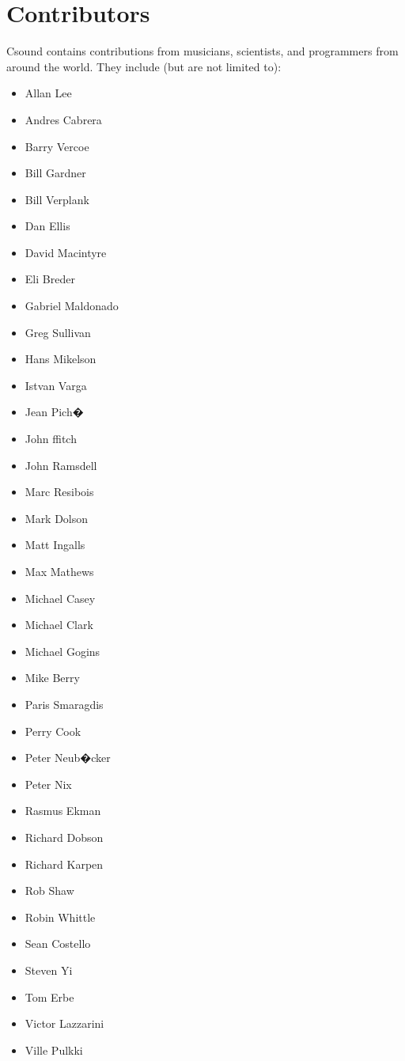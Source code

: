 \documentclass[10pt,letterpaper,onecolumn]{ltxguide}
\begin{document}
\section{Contributors}
Csound contains contributions from musicians, scientists, and programmers from around the world. They include (but are not limited to): 
\begin{itemize}
\item Allan Lee 
\item Andres Cabrera
\item Barry Vercoe
\item Bill Gardner 
\item Bill Verplank 
\item Dan Ellis 
\item David Macintyre 
\item Eli Breder 
\item Gabriel Maldonado  
\item Greg Sullivan 
\item Hans Mikelson 
\item Istvan Varga 
\item Jean Pich� 
\item John ffitch 
\item John Ramsdell 
\item Marc Resibois 
\item Mark Dolson 
\item Matt Ingalls 
\item Max Mathews 
\item Michael Casey 
\item Michael Clark 
\item Michael Gogins 
\item Mike Berry 
\item Paris Smaragdis 
\item Perry Cook 
\item Peter Neub�cker 
\item Peter Nix 
\item Rasmus Ekman 
\item Richard Dobson 
\item Richard Karpen 
\item Rob Shaw 
\item Robin Whittle 
\item Sean Costello 
\item Steven Yi 
\item Tom Erbe 
\item Victor Lazzarini  
\item Ville Pulkki 
\end{itemize}
\end{document}

